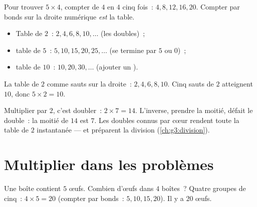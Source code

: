 \begin{method}\label{met:g2:mult:skip}
Pour trouver $5 \times 4$, compter de $4$ en $4$ cinq fois~:
$4, 8, 12, 16, 20$. Compter par bonds sur la droite numérique
\emph{est} la table.
\begin{itemize}
  \item Table de $2$~: $2, 4, 6, 8, 10, \dots$ (les doubles)~;
  \item table de $5$~: $5, 10, 15, 20, 25, \dots$ (se termine par
        $5$ ou $0$)~;
  \item table de $10$~: $10, 20, 30, \dots$ (ajouter un ).
\end{itemize}
\end{method}

\begin{omfigure}

{\small La table de $2$ comme sauts sur la droite~: $2, 4, 6, 8,
10$. Cinq sauts de $2$ atteignent $10$, donc $5 \times 2 = 10$.}
\end{omfigure}

\begin{example}\label{ex:g2:mult:double}
Multiplier par $2$, c'est doubler~: $2 \times 7 = 14$. L'inverse,
prendre la moitié, défait le double~: la moitié de $14$ est
$7$. Les doubles connus par cœur rendent toute la table de $2$
instantanée --- et préparent la division
(\cref{ch:g3:division}).
\end{example}

\section{Multiplier dans les problèmes}

\begin{example}\label{ex:g2:mult:problem}
\guillemotleft{} Une boîte contient $5$ œufs. Combien
d'œufs dans $4$ boîtes~? \guillemotright{} Quatre groupes de
cinq~: $4 \times 5 = 20$ (compter par bonds~: $5, 10, 15, 20$). Il y
a $20$ œufs.
\end{example}

